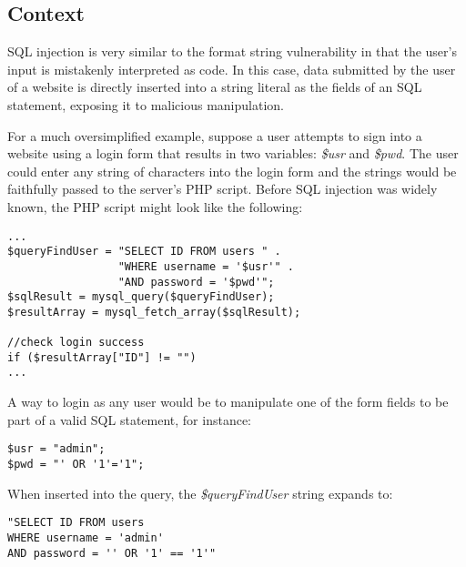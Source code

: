 \subsection{Context} \label{l4_ctx}
SQL injection is very similar to the format string vulnerability in that the user's input is mistakenly interpreted as code. In this case, data submitted by the user of a website is directly inserted into a string literal as the fields of an SQL statement, exposing it to malicious manipulation.

For a much oversimplified example, suppose a user attempts to sign into a website using a login form that results in two variables: \emph{\$usr} and \emph{\$pwd}. The user could enter any string of characters into the login form and the strings would be faithfully passed to the server's PHP script. Before SQL injection was widely known, the PHP script might look like the following:

\begin{minipage}{\linewidth}
\begin{lstlisting}[caption={Vulnerable SQL statement construction},
label={lst:l4_ctx_vulnstm},
frame=single]
...
$queryFindUser = "SELECT ID FROM users " .
                 "WHERE username = '$usr'" .
                 "AND password = '$pwd'";
$sqlResult = mysql_query($queryFindUser);
$resultArray = mysql_fetch_array($sqlResult);

//check login success
if ($resultArray["ID"] != "")
...
\end{lstlisting}
\end{minipage}

A way to login as any user would be to manipulate one of the form fields to be part of a valid SQL statement, for instance:

\begin{minipage}{\linewidth}
\begin{lstlisting}[caption={Malicious login strings passed from the login form},
label={lst:l4_ctx_hackpwd},
frame=single]
$usr = "admin";
$pwd = "' OR '1'='1";
\end{lstlisting}
\end{minipage}

When inserted into the query, the \emph{\$queryFindUser} string expands to:

\begin{minipage}{\linewidth}
\begin{lstlisting}[caption={Vulnerable SQL statement expansion},
label={lst:l4_ctx_hackquery},
frame=single]
"SELECT ID FROM users
WHERE username = 'admin'
AND password = '' OR '1' == '1'"
\end{lstlisting}
\end{minipage}

